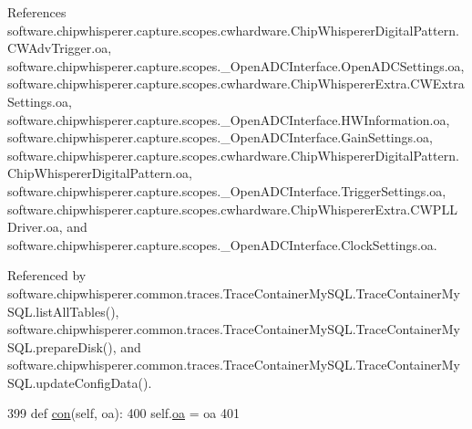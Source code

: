 References software.\+chipwhisperer.\+capture.\+scopes.\+cwhardware.\+Chip\+Whisperer\+Digital\+Pattern.\+C\+W\+Adv\+Trigger.\+oa, software.\+chipwhisperer.\+capture.\+scopes.\+\_\+\+Open\+A\+D\+C\+Interface.\+Open\+A\+D\+C\+Settings.\+oa, software.\+chipwhisperer.\+capture.\+scopes.\+cwhardware.\+Chip\+Whisperer\+Extra.\+C\+W\+Extra\+Settings.\+oa, software.\+chipwhisperer.\+capture.\+scopes.\+\_\+\+Open\+A\+D\+C\+Interface.\+H\+W\+Information.\+oa, software.\+chipwhisperer.\+capture.\+scopes.\+\_\+\+Open\+A\+D\+C\+Interface.\+Gain\+Settings.\+oa, software.\+chipwhisperer.\+capture.\+scopes.\+cwhardware.\+Chip\+Whisperer\+Digital\+Pattern.\+Chip\+Whisperer\+Digital\+Pattern.\+oa, software.\+chipwhisperer.\+capture.\+scopes.\+\_\+\+Open\+A\+D\+C\+Interface.\+Trigger\+Settings.\+oa, software.\+chipwhisperer.\+capture.\+scopes.\+cwhardware.\+Chip\+Whisperer\+Extra.\+C\+W\+P\+L\+L\+Driver.\+oa, and software.\+chipwhisperer.\+capture.\+scopes.\+\_\+\+Open\+A\+D\+C\+Interface.\+Clock\+Settings.\+oa.



Referenced by software.\+chipwhisperer.\+common.\+traces.\+Trace\+Container\+My\+S\+Q\+L.\+Trace\+Container\+My\+S\+Q\+L.\+list\+All\+Tables(), software.\+chipwhisperer.\+common.\+traces.\+Trace\+Container\+My\+S\+Q\+L.\+Trace\+Container\+My\+S\+Q\+L.\+prepare\+Disk(), and software.\+chipwhisperer.\+common.\+traces.\+Trace\+Container\+My\+S\+Q\+L.\+Trace\+Container\+My\+S\+Q\+L.\+update\+Config\+Data().


\begin{DoxyCode}
399     \textcolor{keyword}{def }\hyperlink{classsoftware_1_1chipwhisperer_1_1capture_1_1scopes_1_1cwhardware_1_1ChipWhispererExtra_1_1CWPLLDriver_af879dc02c87a05b98bbb212d8289ec68}{con}(self, oa):
400         self.\hyperlink{classsoftware_1_1chipwhisperer_1_1capture_1_1scopes_1_1cwhardware_1_1ChipWhispererExtra_1_1CWPLLDriver_a650f1d358411a7a3cc68cac107516d19}{oa} = oa
401 
\end{DoxyCode}
\hypertarget{classsoftware_1_1chipwhisperer_1_1capture_1_1scopes_1_1cwhardware_1_1ChipWhispererExtra_1_1CWPLLDriver_a95f7ffcb9965893aa4e30add20ff44fb}{}
